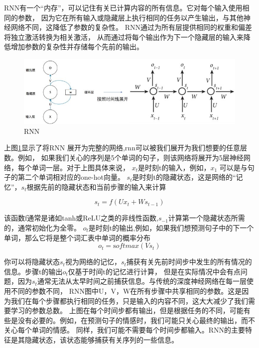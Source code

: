 RNN有一个“内存”，可以记住有关已计算内容的所有信息。它对每个输入使用相同的参数，
因为它在所有输入或隐藏层上执行相同的任务以产生输出，与其他神经网络不同，这降低了参数的复杂性。
RNN通过为所有层提供相同的权重和偏差将独立激活转换为相关激活，
从而通过将每个输出作为下一个隐藏层的输入来降低增加参数的复杂性并存储每个先前的输出。

\begin{figure}[htbp]
  \centering
  \includegraphics[scale=0.5]{./images/rnn.jpg}
  \caption{RNN}
  \label{fig:rnn}
\end{figure}

上图\ref{fig:rnn}显示了将RNN 展开为完整的网络,rnn可以被我们展开为我们想要的任意层数。例如，
如果我们关心的序列是5个单词的句子，则该网络将展开为5层神经网络，每个单词一层。对于上图具体来说，
$x_{t}$是时刻t的输入，例如，$x_{1}$ 可以是与句子的第二个单词相对应的one-hot向量。
$s_{t}$是时刻t的隐藏状态，这是网络的“记忆”，$s_{t}$根据先前的隐藏状态和当前步骤的输入来计算

\begin{equation}
  s_{t}=f(U x_{t}+W s_{t-1})
  \end{equation}

该函数f通常是诸如tanh或ReLU之类的非线性函数,$s_{-1}$计算第一个隐藏状态所需的，通常初始化为全零。
$o_{t}$是时刻t的输出,例如，如果我们想预测句子中的下一个单词，那么它将是整个词汇表中单词的概率分布
\begin{equation}
  o_t = \mathrm softmax (V s_t)
  \end{equation}

  你可以将隐藏状态$s_{t}$视为网络的记忆，$s_{t}$捕获有关先前时间步中发生的所有情况的信息。步骤t的输出$o_{t}$仅基于时间t的记忆进行计算，
  但是在实际情况中会有点问题，因为$s_{t}$通常无法从太早时间之前捕获信息。与传统的深度神经网络在每一层使用不同的参数不同，
  RNN图中U，V，W在所有步骤中共享相同的参数。这是因为我们在每个步骤都执行相同的任务，只是输入的内容不同，这大大减少了我们需要学习的参数总数。
  上图在每个时间步都有输出，但是根据任务的不同，可能有些是没有必要的。例如，在预测句子的情感时，我们可能只关心最终的输出，而不关心每个单词的情感。
  同样，我们可能不需要每个时间步都输入。RNN的主要特征是其隐藏状态，该状态能够捕获有关序列的一些信息。



